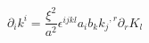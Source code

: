 \begin{equation}{\partial}_{i}k^{i}= \frac{{\xi}^{2}}{a^{2}}{\epsilon}^{ijkl}a_{i}b_{k}{k_{j}}^{,r}{\partial}_{r}K_{l}
\label{21}
\end{equation}

